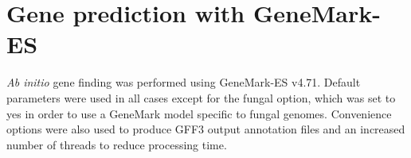 




\section{Gene prediction with GeneMark-ES}

\textit{Ab initio} gene finding was performed using GeneMark-ES
v4.71. Default parameters were used in all cases except for the fungal
option, which was set to yes in order to use a GeneMark model specific
to fungal genomes. Convenience options were also used to produce GFF3
output annotation files and an increased number of threads to reduce
processing time.

%

